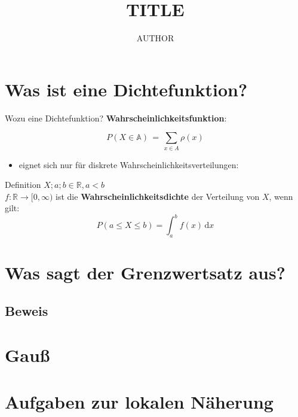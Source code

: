 \documentclass[14pt]{beamer}
\author{AUTHOR}
\title{TITLE}
\institute{Herder Gymnasium Berlin}
\date{}
\begin{document}
\begin{frame}
\titlepage
\end{frame}

\begin{frame}
\tableofcontents
\end{frame}

\section{Was ist eine Dichtefunktion?}
\begin{frame}{Wozu eine Dichtefunktion?}
\textbf{Wahrscheinlichkeitsfunktion}:

{\small $$ P(X \in\mathbb{A}) \, = \, \sum_{x\in A} \rho(x) $$}
\begin{itemize}

\item eignet sich nur für diskrete Wahrscheinlichkeitsverteilungen:

\begin{itemize}
\end{itemize}
\end{itemize}

\end{frame}

\begin{frame}{Definition}
$ X;a;b \in \mathbb{R}, a<b$\\
$f \colon \mathbb{R} \rightarrow [0,\infty)$ ist die \textbf{Wahrscheinlichkeitsdichte} der Verteilung von $X$, wenn gilt:
$$
P(a\leq X\leq b)=\int_a^bf(x)\,\mathrm dx
$$
\end{frame}



\section{Was sagt der Grenzwertsatz aus?} %
\subsection{Beweis} %
\section{Gauß} %
\section{Aufgaben zur lokalen Näherung}
\end{document}
